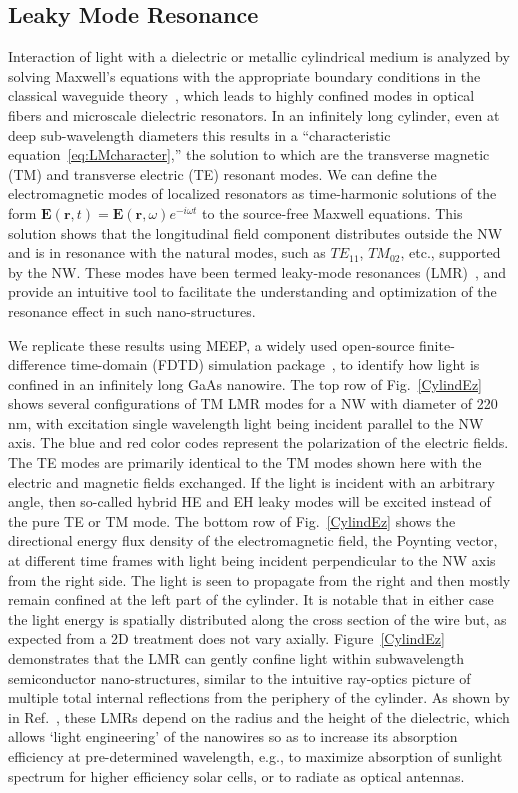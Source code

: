 \subsection{Leaky Mode Resonance}
\label{sec:LMR}

Interaction of light with a dielectric or metallic cylindrical medium is
analyzed by solving Maxwell's equations with the appropriate boundary
conditions in the classical waveguide theory~\cite{Kapany:tq}, which leads to
highly confined modes in optical fibers and microscale dielectric resonators.
In an infinitely long cylinder, even at deep sub-wavelength diameters this
results in a “characteristic equation~\ref{eq:LMcharacter},” the solution to
which are the transverse magnetic (TM) and transverse electric (TE) resonant
modes. We can define the electromagnetic modes of localized resonators as
time-harmonic solutions of the form $\bm{E}(\bm{r},t) =
\bm{E}(\bm{r},\omega)e^{-i\omega{t}}$ to the source-free Maxwell equations.
This solution shows that the longitudinal field component distributes outside
the NW and is in resonance with the natural modes, such as ${TE}_{11}$,
${TM}_{02}$, etc., supported by the NW.  These modes have been termed
leaky-mode resonances (LMR)~\cite{Cao:2009ho,Fountaine:2014de}, and provide an
intuitive tool to facilitate the understanding and optimization of the
resonance effect in such nano-structures.

We replicate these results using MEEP, a widely used open-source
finite-difference time-domain (FDTD) simulation package~\cite{Oskooi:2010fb},
to identify how light is confined in an infinitely long GaAs nanowire. The top
row of Fig.~\ref{CylindEz} shows several configurations of TM LMR modes for a
NW with diameter of 220 nm, with excitation single wavelength light being
incident parallel to the NW axis. The blue and red color codes represent the
polarization of the electric fields. The TE modes are primarily identical to
the TM modes shown here with the electric and magnetic fields exchanged. If the
light is incident with an arbitrary angle, then so-called hybrid HE and EH
leaky modes will be excited instead of the pure TE or TM mode. The bottom row
of Fig.~\ref{CylindEz} shows the directional energy flux density of the
electromagnetic field, the Poynting vector, at different time frames with light
being incident perpendicular to the NW axis from the right side. The light is
seen to propagate from the right and then mostly remain confined at the left
part of the cylinder. It is notable that in either case the light energy is
spatially distributed along the cross section of the wire but, as expected from
a 2D treatment does not vary axially. Figure~\ref{CylindEz} demonstrates that
the LMR can gently confine light within subwavelength semiconductor
nano-structures, similar to the intuitive ray-optics picture of multiple total
internal reflections from the periphery of the cylinder. As shown by in
Ref.~\cite{Cao:2009ho}, these LMRs depend on the radius and the height of the
dielectric, which allows ‘light engineering’ of the nanowires so as to increase
its absorption efficiency at pre-determined wavelength, e.g., to maximize
absorption of sunlight spectrum for higher efficiency solar cells, or to
radiate as optical antennas.

